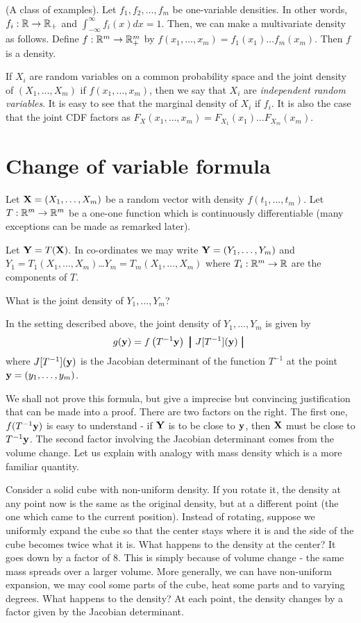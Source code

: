 \documentclass[preprint,  11pt]{amsart}
\def\X{{\bf X}}
\def\Y{{\bf Y}}
\begin{document}
\beg (A class of examples). Let $f_{1},f_{2},\ldots ,f_{m}$ be one-variable densities. In other words, $f_{i}:\mathbb{R}\rightarrow \mathbb{R}_{+}$ and $\int_{-\infty}^{\infty}f_{i}(x)dx=1$. Then, we can make a multivariate density as follows. Define $f:\mathbb{R}^{m}\rightarrow \mathbb{R}_{+}^{m}$ by $f(x_{1},\ldots ,x_{m})=f_{1}(x_{1})\ldots f_{m}(x_{m})$. Then $f$ is a density.

If $X_{i}$ are random variables on a common probability space and the joint density of $(X_{1},\ldots ,X_{m})$  if $f(x_{1},\ldots ,x_{m})$, then we say that $X_{i}$ are {\em independent random variables}. It is easy to see that the marginal density of $X_{i}$ if $f_{i}$. It is also the case that the joint CDF factors as $F_{X}(x_{1},\ldots ,x_{m})=F_{X_{1}}(x_{1})\ldots F_{X_{m}}(x_{m})$.
\eeg
\section{Change of variable formula}
Let $\X=(X_{1},\ldots ,X_{m})$ be a random vector with density $f(t_{1},\ldots ,t_{m})$. Let $T:\mathbb{R}^{m}\rightarrow \mathbb{R}^{m}$ be a one-one function which is continuously differentiable (many exceptions can be made as remarked later).

Let $\Y=T(\X)$. In co-ordinates we may write $\Y=(Y_{1},\ldots ,Y_{m})$ and $Y_{1}=T_{1}(X_{1},\ldots ,X_{m})$\dots $Y_{m}=T_{m}(X_{1},\ldots ,X_{m})$ where $T_{i}:\mathbb{R}^{m}\rightarrow \mathbb{R}$ are the components of $T$.

 What is the joint density of $Y_{1},\ldots ,Y_{m}$?

 In the setting described above,  the joint density of $Y_{1},\ldots ,Y_{m}$ is given by
$$
g({\bf y})=f\left(T^{-1}{\bf y}\right)\ \pmb{\big|} \  J[T^{-1}]({\bf y})\ \pmb{\big|} \ 
$$
where $J[T^{-1}]({\bf y})$ is the Jacobian determinant of the function $T^{-1}$ at the point ${\bf y}=(y_{1},\ldots ,y_{m})$.

 We shall not prove this formula, but give a imprecise but convincing justification that can be made into a proof. There are two factors on the right.  The first one, $f(T^{-1}{\bf y})$ is easy to understand - if $\Y$ is to be close to ${\bf y}$, then $\X$ must be close to $T^{-1}{\bf y}$. The second factor involving the Jacobian determinant comes from the volume change. Let us explain with analogy with mass density which is a more familiar quantity.

Consider a solid cube with non-uniform density. If you rotate it, the density at any point now is the same as the original density, but at a different point (the one which came to the current position). Instead of rotating, suppose we uniformly expand the cube so that the center stays where it is and the side of the cube becomes twice what it is. What happens to the density at the center? It goes down by a factor of $8$. This is simply because of volume change - the same mass spreads over a larger volume. More generally, we can have non-uniform expansion, we may cool some parts of the cube, heat some parts and to varying degrees. What happens to the density? At each point, the density changes by a factor given by the Jacobian determinant.
\end{document}
